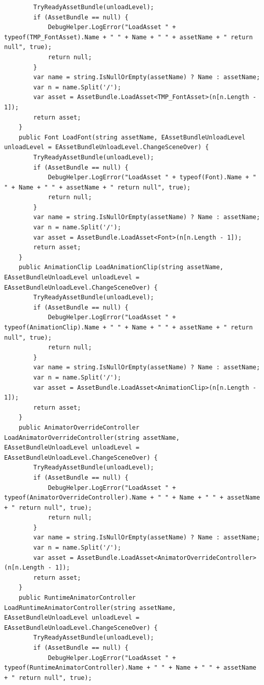 \documentclass[9pt, b5paper]{article}
\begin{document}
\begin{itemize}
\begin{verbatim}
        TryReadyAssetBundle(unloadLevel);
        if (AssetBundle == null) {
            DebugHelper.LogError("LoadAsset " + typeof(TMP_FontAsset).Name + " " + Name + " " + assetName + " return null", true);
            return null;
        }
        var name = string.IsNullOrEmpty(assetName) ? Name : assetName;
        var n = name.Split('/');
        var asset = AssetBundle.LoadAsset<TMP_FontAsset>(n[n.Length - 1]);
        return asset;
    }
    public Font LoadFont(string assetName, EAssetBundleUnloadLevel unloadLevel = EAssetBundleUnloadLevel.ChangeSceneOver) {
        TryReadyAssetBundle(unloadLevel);
        if (AssetBundle == null) {
            DebugHelper.LogError("LoadAsset " + typeof(Font).Name + " " + Name + " " + assetName + " return null", true);
            return null;
        }
        var name = string.IsNullOrEmpty(assetName) ? Name : assetName;
        var n = name.Split('/');
        var asset = AssetBundle.LoadAsset<Font>(n[n.Length - 1]);
        return asset;
    }
    public AnimationClip LoadAnimationClip(string assetName, EAssetBundleUnloadLevel unloadLevel = EAssetBundleUnloadLevel.ChangeSceneOver) {
        TryReadyAssetBundle(unloadLevel);
        if (AssetBundle == null) {
            DebugHelper.LogError("LoadAsset " + typeof(AnimationClip).Name + " " + Name + " " + assetName + " return null", true);
            return null;
        }
        var name = string.IsNullOrEmpty(assetName) ? Name : assetName;
        var n = name.Split('/');
        var asset = AssetBundle.LoadAsset<AnimationClip>(n[n.Length - 1]);
        return asset;
    }
    public AnimatorOverrideController LoadAnimatorOverrideController(string assetName, EAssetBundleUnloadLevel unloadLevel = EAssetBundleUnloadLevel.ChangeSceneOver) {
        TryReadyAssetBundle(unloadLevel);
        if (AssetBundle == null) {
            DebugHelper.LogError("LoadAsset " + typeof(AnimatorOverrideController).Name + " " + Name + " " + assetName + " return null", true);
            return null;
        }
        var name = string.IsNullOrEmpty(assetName) ? Name : assetName;
        var n = name.Split('/');
        var asset = AssetBundle.LoadAsset<AnimatorOverrideController>(n[n.Length - 1]);
        return asset;
    }
    public RuntimeAnimatorController LoadRuntimeAnimatorController(string assetName, EAssetBundleUnloadLevel unloadLevel = EAssetBundleUnloadLevel.ChangeSceneOver) {
        TryReadyAssetBundle(unloadLevel);
        if (AssetBundle == null) {
            DebugHelper.LogError("LoadAsset " + typeof(RuntimeAnimatorController).Name + " " + Name + " " + assetName + " return null", true);

\end{verbatim}
\end{itemize}
\end{document}
